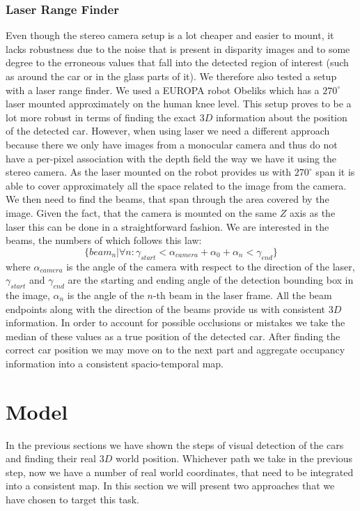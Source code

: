         \subsubsection{Laser Range Finder} %
        \label{ssub:laser_range_finder}
            Even though the stereo camera setup is a lot cheaper and easier to mount, it lacks robustness due to the noise that is present in disparity images and to some degree to the erroneous values that fall into the detected region of interest (such as around the car or in the glass parts of it). We therefore also tested a setup with a laser range finder. We used a EUROPA robot Obeliks which has a $270^\circ$ laser mounted approximately on the human knee level. This setup proves to be a lot more robust in terms of finding the exact $3D$ information about the position of the detected car.
            However, when using laser we need a different approach because there we only have images from a monocular camera and thus do not have a per-pixel association with the depth field the way we have it using the stereo camera.
            As the laser mounted on the robot provides us with $270^\circ$ span it is able to cover approximately all the space related to the image from the camera. We then need to find the beams, that span through the area covered by the image. Given the fact, that the camera is mounted on the same $Z$ axis as the laser this can be done in a straightforward fashion. We are interested in the beams, the numbers of which follows this law:
            $$ \{ beam_n | \forall n : \gamma_{start} < \alpha_{camera} + \alpha_{0} + \alpha_{n} < \gamma_{end} \}$$
            where $\alpha_{camera}$ is the angle of the camera with respect to the direction of the laser, $\gamma_{start}$ and $\gamma_{end}$ are the starting and ending angle of the detection bounding box in the image, $\alpha_{n}$ is the angle of the $n$-th beam in the laser frame.
            All the beam endpoints along with the direction of the beams provide us with consistent $3D$ information. In order to account for possible occlusions or mistakes we take the median of these values as a true position of the detected car.
            After finding the correct car position we may move on to the next part and aggregate occupancy information into a consistent spacio-temporal map.

\section{Model} %
\label{sec:model}
    In the previous sections we have shown the steps of visual detection of the cars and finding their real $3D$ world position.
    Whichever path we take in the previous step, now we have a number of real world coordinates, that need to be integrated into a consistent map. In this section we will present two approaches that we have chosen to target this task.
